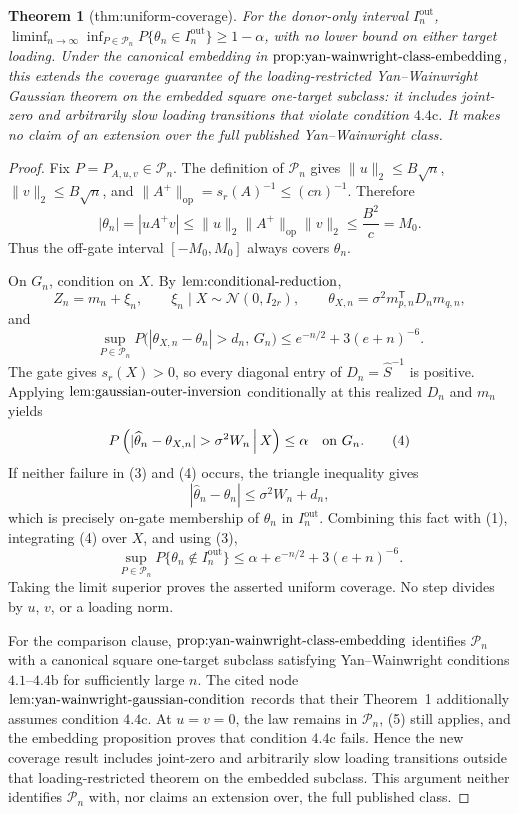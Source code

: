 \documentclass{article}
\newtheorem{theorem}{Theorem}
\begin{document}
\begin{theorem}[thm:uniform-coverage]\label{thm:uniform-coverage}
For the donor-only interval \(I_n^{\mathrm{out}}\), \(\liminf_{n\to\infty}\inf_{P\in\mathcal P_n}P\{\theta_n\in I_n^{\mathrm{out}}\}\ge1-\alpha\), with no lower bound on either target loading.  Under the canonical embedding in \(\textup{prop:yan-wainwright-class-embedding}\), this extends the coverage guarantee of the loading-restricted Yan--Wainwright Gaussian theorem on the embedded square one-target subclass: it includes joint-zero and arbitrarily slow loading transitions that violate condition \(4.4\mathrm{c}\).  It makes no claim of an extension over the full published Yan--Wainwright class.
\end{theorem}
\begin{proof}
Fix \(P=P_{A,u,v}\in\mathcal P_n\).  The definition of \(\mathcal P_n\) gives \(\|u\|_2\le B\sqrt n\), \(\|v\|_2\le B\sqrt n\), and \(\|A^+\|_{\mathrm{op}}=s_r(A)^{-1}\le(cn)^{-1}\).  Therefore
\[
|\theta_n|=|uA^+v|
\le\|u\|_2\|A^+\|_{\mathrm{op}}\|v\|_2
\le\frac{B^2}{c}=M_0.
\tag{1}
\]
Thus the off-gate interval \([-M_0,M_0]\) always covers \(\theta_n\).

On \(G_n\), condition on \(X\).  By \(\textup{lem:conditional-reduction}\),
\[
Z_n=m_n+\xi_n,\qquad \xi_n\mid X\sim\mathcal N(0,I_{2r}),
\qquad
\theta_{X,n}=\sigma^2m_{p,n}^{\mathsf T}D_nm_{q,n},
\tag{2}
\]
and
\[
\sup_{P\in\mathcal P_n}
P\bigl(|\theta_{X,n}-\theta_n|>d_n,\,G_n\bigr)
\le e^{-n/2}+3(e+n)^{-6}.
\tag{3}
\]
The gate gives \(s_r(X)>0\), so every diagonal entry of \(D_n=\widehat S^{-1}\) is positive.  Applying \(\textup{lem:gaussian-outer-inversion}\) conditionally at this realized \(D_n\) and \(m_n\) yields
\[
P\left(
|\widehat\theta_n-\theta_{X,n}|>\sigma^2W_n
\,\middle|\,X\right)\le\alpha
\quad\hbox{on \(G_n\)}.
\tag{4}
\]
If neither failure in (3) and (4) occurs, the triangle inequality gives
\[
|\widehat\theta_n-\theta_n|
\le\sigma^2W_n+d_n,
\]
which is precisely on-gate membership of \(\theta_n\) in \(I_n^{\mathrm{out}}\).  Combining this fact with (1), integrating (4) over \(X\), and using (3),
\[
\sup_{P\in\mathcal P_n}P\{\theta_n\notin I_n^{\mathrm{out}}\}
\le\alpha+e^{-n/2}+3(e+n)^{-6}.
\tag{5}
\]
Taking the limit superior proves the asserted uniform coverage.  No step divides by \(u\), \(v\), or a loading norm.

For the comparison clause, \(\textup{prop:yan-wainwright-class-embedding}\) identifies \(\mathcal P_n\) with a canonical square one-target subclass satisfying Yan--Wainwright conditions \(4.1\)--\(4.4\mathrm b\) for sufficiently large \(n\).  The cited node \(\textup{lem:yan-wainwright-gaussian-condition}\) records that their Theorem~1 additionally assumes condition \(4.4\mathrm c\).  At \(u=v=0\), the law remains in \(\mathcal P_n\), (5) still applies, and the embedding proposition proves that condition \(4.4\mathrm c\) fails.  Hence the new coverage result includes joint-zero and arbitrarily slow loading transitions outside that loading-restricted theorem on the embedded subclass.  This argument neither identifies \(\mathcal P_n\) with, nor claims an extension over, the full published class.
\end{proof}
\end{document}
